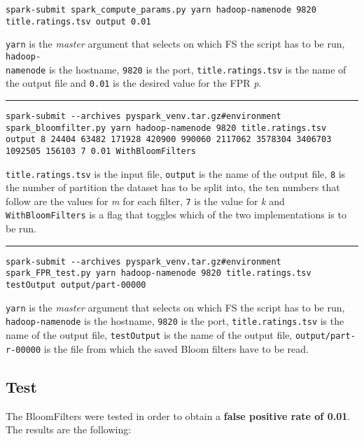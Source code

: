 \begin{lstlisting}[basicstyle=\ttfamily\footnotesize, breaklines=true, backgroundcolor = \color{lightgray}]
spark-submit spark_compute_params.py yarn hadoop-namenode 9820 title.ratings.tsv output 0.01
\end{lstlisting}
\hfill \break
\texttt{yarn} is the \textit{master} argument that selects on which FS the script has to be run, \texttt{hadoop-\\namenode} is the hostname, \texttt{9820} is the port, \texttt{title.ratings.tsv} is the name of the output file and \texttt{0.01} is the desired value for the FPR \textit{p}.
\vspace{5pt}
\hrule
\vspace{6pt}
\begin{lstlisting}[basicstyle=\ttfamily\footnotesize,breaklines=true, backgroundcolor = \color{lightgray}]
spark-submit --archives pyspark_venv.tar.gz#environment spark_bloomfilter.py yarn hadoop-namenode 9820 title.ratings.tsv output 8 24404 63482 171928 420900 990060 2117062 3578304 3406703 1092505 156103 7 0.01 WithBloomFilters
\end{lstlisting}
\hfill \break
\texttt{title.ratings.tsv} is the input file, \texttt{output} is the name of the output file, \texttt{8} is the number of partition the dataset has to be split into, the ten numbers that follow are the values for \textit{m} for each filter, \texttt{7} is the value for \textit{k} and \texttt{WithBloomFilters} is a flag that toggles which of the two implementations is to be run.
\vspace{5pt}
\hrule
\vspace{6pt}
\begin{lstlisting}[basicstyle=\ttfamily\footnotesize, breaklines=true, backgroundcolor = \color{lightgray}]
spark-submit --archives pyspark_venv.tar.gz#environment spark_FPR_test.py yarn hadoop-namenode 9820 title.ratings.tsv testOutput output/part-00000
\end{lstlisting}
\hfill \break
\texttt{yarn} is the \textit{master } argument that selects on which FS the script has to be run, \texttt{hadoop-namenode} is the hostname, \texttt{9820} is the port, \texttt{title.ratings.tsv} is the name of the output file, \texttt{testOutput} is the name of the output file, \texttt{output/part-r-00000} is the file from which the saved Bloom filters have to be read.

\subsection*{Test}\label{sub:testSpark}
The BloomFilters were tested in order to obtain a \textbf{false positive rate of 0.01}. The results are the following:\\

